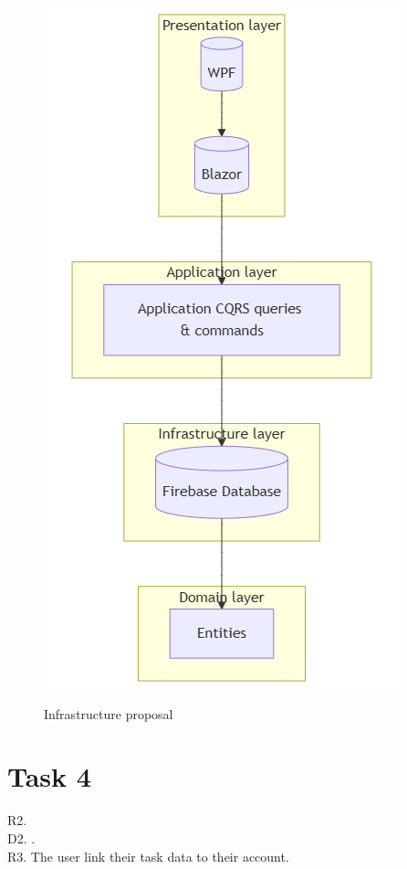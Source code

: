 \documentclass{article}
\begin{document}
\begin{figure}[t!]
  \includegraphics{images/infrastructure-proposal.png}
  \label{Infrastructure proposal}
  \caption{Infrastructure proposal}
\end{figure}
\clearpage

\section{Task 4}

R2. \\
D2. .
\\[1em]
R3. The user link their task data to their account.\\
\end{document}
